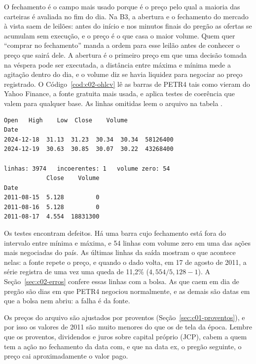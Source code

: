 O fechamento é o campo mais usado porque é o preço pelo qual a maioria das carteiras é avaliada no fim do dia. Na B3, a abertura e o fechamento do mercado à vista saem de leilões: antes do início e nos minutos finais do pregão as ofertas se acumulam sem execução, e o preço é o que casa o maior volume. Quem quer ``comprar no fechamento'' manda a ordem para esse leilão antes de conhecer o preço que sairá dele. A abertura é o primeiro preço em que uma decisão tomada na véspera pode ser executada, a distância entre máxima e mínima mede a agitação dentro do dia, e o volume diz se havia liquidez para negociar ao preço registrado. O Código~\ref{cod:c02-ohlcv} lê as barras de PETR4 tais como vieram do Yahoo Finance, a fonte gratuita mais usada, e aplica testes de coerência que valem para qualquer base. As linhas omitidas leem o arquivo na tabela .


\begin{lstlisting}[style=saida]
             Open   High    Low  Close    Volume
Date
2024-12-18  31.13  31.23  30.34  30.34  58126400
2024-12-19  30.63  30.85  30.07  30.22  43268400

linhas: 3974   incoerentes: 1   volume zero: 54
            Close    Volume
Date
2011-08-15  5.128         0
2011-08-16  5.128         0
2011-08-17  4.554  18831300
\end{lstlisting}

Os testes encontram defeitos. Há uma barra cujo fechamento está fora do intervalo entre mínima e máxima, e 54 linhas com volume zero em uma das ações mais negociadas do país. As últimas linhas da saída mostram o que acontece nelas: a fonte repete o preço, e quando o dado volta, em 17 de agosto de 2011, a série registra de uma vez uma queda de 11,2\% ($4,554 / 5,128 - 1$). A Seção~\ref{sec:c02-erros} confere essas linhas com a bolsa. As que caem em dia de pregão são dias em que PETR4 negociou normalmente, e as demais são datas em que a bolsa nem abriu: a falha é da fonte.

Os preços do arquivo são ajustados por proventos (Seção~\ref{sec:c01-proventos}), e por isso os valores de 2011 são muito menores do que os de tela da época. Lembre que os proventos, dividendos e juros sobre capital próprio (JCP), cabem a quem tem a ação no fechamento da data com, e que na data ex, o pregão seguinte, o preço cai aproximadamente o valor pago.


